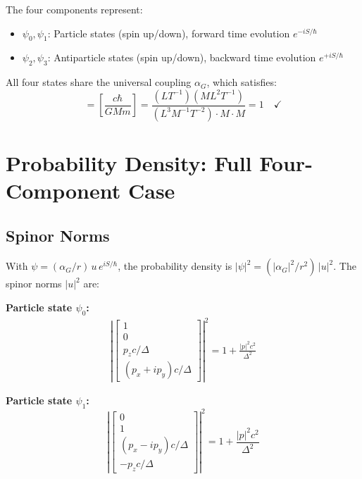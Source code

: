 \documentclass[11pt,a4paper]{article}
\theoremstyle{definition}
\theoremstyle{remark}
\begin{document}
	The four components represent:
	\begin{itemize}
		\item $\psi_0,\psi_1$: Particle states (spin up/down), forward time evolution $e^{-iS/\hbar}$
		\item $\psi_2,\psi_3$: Antiparticle states (spin up/down), backward time evolution $e^{+iS/\hbar}$
	\end{itemize}
	
	All four states share the universal coupling $\alpha_G$, which satisfies:
	\begin{equation}
		[\alpha_G^2] = \left[\frac{c\hbar}{GMm}\right] = \frac{(LT^{-1})(ML^2T^{-1})}{(L^3M^{-1}T^{-2})\cdot M\cdot M} = 1 \quad\checkmark
	\end{equation}
	
	\section{Probability Density: Full Four-Component Case}
	
	\subsection{Spinor Norms}
	
	With $\psi = (\alpha_G/r)\,u\,e^{iS/\hbar}$, the probability density is $|\psi|^2 = (|\alpha_G|^2/r^2)\,|u|^2$.  The spinor norms $|u|^2$ are:
	
	\textbf{Particle state $\psi_0$:}
	\begin{align}
		\left|\begin{bmatrix}1\\0\\ p_zc/\Delta\\ (p_x+ip_y)c/\Delta\end{bmatrix}\right|^2
		= 1 + \frac{|p|^2 c^2}{\Delta^2}
		\label{eq:norm_psi0}
	\end{align}
	
	\textbf{Particle state $\psi_1$:}
	\begin{equation}
		\left|\begin{bmatrix}0\\1\\ (p_x-ip_y)c/\Delta\\ -p_zc/\Delta\end{bmatrix}\right|^2 = 1 + \frac{|p|^2 c^2}{\Delta^2}
		\label{eq:norm_psi1}
	\end{equation}
	
\end{document}
